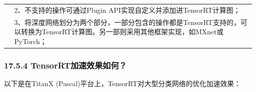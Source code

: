 \begin{longtable}[]{ ll }
\begin{minipage}[t]{0.38\columnwidth}
\strut
\end{minipage} & \begin{minipage}[t]{0.56\columnwidth}\raggedright\strut
2、不支持的操作可通过Plugin API实现自定义并添加进TensorRT计算图；\strut
\end{minipage}\tabularnewline
\begin{minipage}[t]{0.38\columnwidth}\raggedright\strut
\strut
\end{minipage} & \begin{minipage}[t]{0.56\columnwidth}\raggedright\strut
3、将深度网络划分为两个部分，一部分包含的操作都是TensorRT支持的，可以转换为TensorRT计算图。另一部则采用其他框架实现，如MXnet或PyTorch；\strut
\end{minipage}\tabularnewline
\bottomrule
\end{longtable}

\subsubsection{17.5.4
TensorRT加速效果如何？}\label{tensorrtux52a0ux901fux6548ux679cux5982ux4f55}

以下是在TitanX (Pascal)平台上，TensorRT对大型分类网络的优化加速效果：

